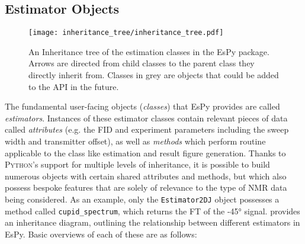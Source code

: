 \subsection{Estimator Objects}
\label{subsec:estimator-objects}
\begin{figure}
    \centering
    \texttt{[image: inheritance\_tree/inheritance\_tree.pdf]}
    \caption[
        An inheritance tree of the estimation classes in the \acs{EsPy} package.
    ]{
        An Inheritance tree of the estimation classes in the \acs{EsPy} package.
        Arrows are directed from child classes to the parent class they
        directly inherit from. Classes in grey are objects that could be added
        to the \ac{API} in the future.
    }
    \label{fig:inheritance}
\end{figure}
The fundamental user-facing objects (\emph{classes}) that \ac{EsPy} provides are
called \emph{estimators}.
Instances of these estimator classes contain relevant pieces of data called
\emph{attributes} (e.g. the \ac{FID} and experiment parameters including the sweep
width and transmitter offset), as well as \emph{methods} which perform
routine applicable to the class like estimation and result figure generation.
Thanks to \textsc{Python}'s support for multiple levels of inheritance, it is
possible to build numerous objects with certain shared attributes and methods,
but which also possess bespoke features that are solely of relevance to
the type of \ac{NMR} data being considered. As an example, only the
\texttt{Estimator2DJ} object possesses a method called \texttt{cupid\_spectrum},
which returns the \ac{FT} of the \ang{-45} signal.
 provides an inheritance
diagram, outlining the relationship between different estimators in
\ac{EsPy}. Basic overviews of each of these are as follows:
